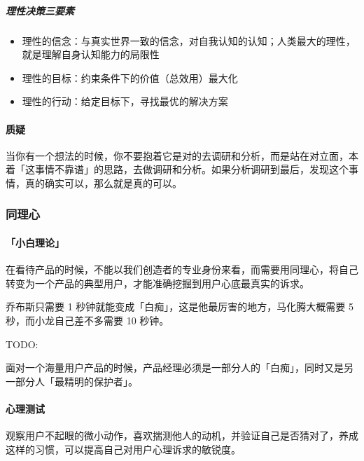 \documentclass[letterpaper,10pt,english]{sphinxmanual}
\begin{document}
\subparagraph{理性决策三要素}
\label{\detokenize{chapter_idea/idea:id8}}\begin{itemize}
\item {} 
理性的信念：与真实世界一致的信念，对自我认知的认知；人类最大的理性，就是理解自身认知能力的局限性

\item {} 
理性的目标：约束条件下的价值（总效用）最大化

\item {} 
理性的行动：给定目标下，寻找最优的解决方案

\end{itemize}


\paragraph{质疑}
\label{\detokenize{chapter_idea/idea:id9}}
当你有一个想法的时候，你不要抱着它是对的去调研和分析，而是站在对立面，本着「这事情不靠谱」的思路，去做调研和分析。如果分析调研到最后，发现这个事情，真的确实可以，那么就是真的可以。%
\begin{footnote}[371]\sphinxAtStartFootnote
{}
%
\end{footnote}


\subsubsection{同理心}
\label{\detokenize{chapter_idea/empathy:id1}}\label{\detokenize{chapter_idea/empathy::doc}}

\paragraph{「小白理论」}
\label{\detokenize{chapter_idea/empathy:id2}}
在看待产品的时候，不能以我们创造者的专业身份来看，而需要用同理心，将自己转变为一个产品的典型用户，才能准确挖掘到用户心底最真实的诉求。

乔布斯只需要 1 秒钟就能变成「白痴」，这是他最厉害的地方，马化腾大概需要
5 秒，而小龙自己差不多需要 10 秒钟。

TODO:

面对一个海量用户产品的时候，产品经理必须是一部分人的「白痴」，同时又是另一部分人「最精明的保护者」。


\paragraph{心理测试}
\label{\detokenize{chapter_idea/empathy:id3}}
观察用户不起眼的微小动作，喜欢揣测他人的动机，并验证自己是否猜对了，养成这样的习惯，可以提高自己对用户心理诉求的敏锐度。
\end{document}
